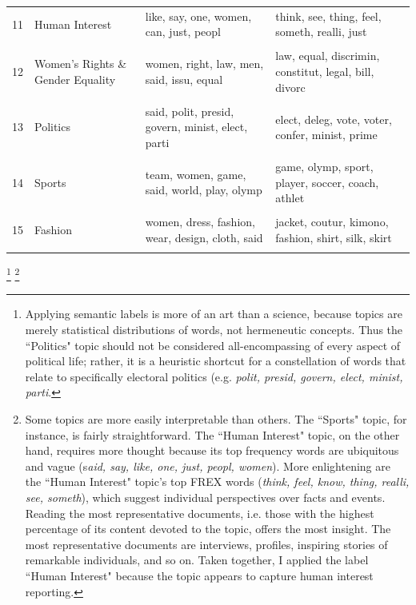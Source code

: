 \documentclass[11pt, oneside]{article}
\begin{document}
\begin{table}[!p]
\begin{tabular}{p{.3cm} M{4cm} | M{5cm} | M{5 cm} }
  11 & Human Interest & like, say, one, women, can, just, peopl & think, see, thing, feel, someth, realli, just \\ &&&\\
  12 & Women's Rights \& Gender Equality & women, right, law, men, said, issu, equal & law, equal, discrimin, constitut, legal, bill, divorc \\ &&&\\
  13 & Politics & said, polit, presid, govern, minist, elect, parti & elect, deleg, vote, voter, confer, minist, prime \\ &&&\\
  14 & Sports & team, women, game, said, world, play, olymp & game, olymp, sport, player, soccer, coach, athlet \\ &&&\\
  15 & Fashion & women, dress, fashion, wear, design, cloth, said & jacket, coutur, kimono, fashion, shirt, silk, skirt \\ &&&\\
   \hline
\end{tabular}
\end{table}

\footnote{\hspace{5} Applying semantic labels is more of an art than a science, because topics are merely statistical distributions of words, not hermeneutic concepts. Thus the ``Politics" topic should not be considered all-encompassing of every aspect of political life; rather, it is a heuristic shortcut for a constellation of words that relate to specifically electoral politics (e.g. \emph{polit, presid, govern, elect, minist, parti}.} \footnote{\hspace{5} Some topics are more easily interpretable than others. The ``Sports" topic, for instance, is fairly straightforward. The ``Human Interest" topic, on the other hand, requires more thought because its top frequency words are ubiquitous and vague (s\emph{aid, say, like, one, just, peopl, women}). More enlightening are the ``Human Interest" topic's top FREX words (\emph{think, feel, know, thing, realli, see, someth}), which suggest individual perspectives over facts and events. Reading the most representative documents, i.e. those with the highest percentage of its content devoted to the topic, offers the most insight. The most representative documents are interviews, profiles, inspiring stories of remarkable individuals, and so on. Taken together, I applied the label ``Human Interest" because the topic appears to capture human interest reporting.}
\end{document}
